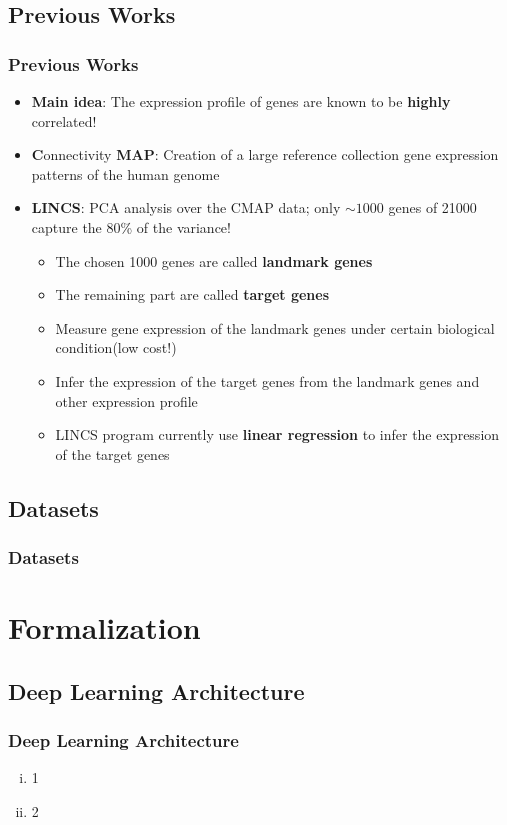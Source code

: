 \documentclass[professionalfont]{beamer}
\begin{document}
    \subsection{Previous Works}
      \begin{frame}
	\frametitle{Previous Works}
	  \begin{itemize}
	   \item \textbf{Main idea}: The expression profile of genes are known to be \textbf{highly} correlated!  
	   \item \textbf{C}onnectivity \textbf{MAP}: Creation of a large reference collection gene expression patterns of the human genome
	   \item \textbf{LINCS}: PCA analysis over the CMAP data; only $\sim 1000$ genes of 21000 capture the 80\% of the variance!
	     \begin{itemize}
	      \item The chosen 1000 genes are called \textbf{landmark genes}
	      \item The remaining part are called \textbf{target genes}
	      \item Measure gene expression of the landmark genes under certain biological condition(low cost!)
	      \item Infer the expression of the target genes from the landmark genes and other expression profile
	      \item LINCS program currently use \textbf{linear regression} to infer the expression of the target genes
	     \end{itemize}
	 \end{itemize}
      \end{frame}

    \subsection{Datasets}
      \begin{frame}
	\frametitle{Datasets}
      \end{frame}

    \section{Formalization}

      \subsection{Deep Learning Architecture}
	\begin{frame}
	  \frametitle{Deep Learning Architecture}
	  \begin{enumerate}[i)]
	    \item 1
	    \item 2
	  \end{enumerate}
	\end{frame}
\end{document}
